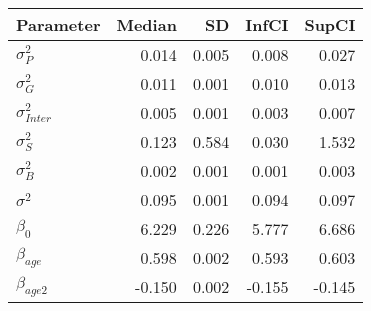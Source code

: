 \begin{table}[ht]
\centering
\begin{tabular}{lrrrr}
  \hline
Parameter & Median & SD & InfCI & SupCI \\ 
  \hline
$\sigma^{2}_{P}$ & 0.014 & 0.005 & 0.008 & 0.027 \\ 
  $\sigma^{2}_{G}$ & 0.011 & 0.001 & 0.010 & 0.013 \\ 
  $\sigma^{2}_{Inter}$ & 0.005 & 0.001 & 0.003 & 0.007 \\ 
  $\sigma^{2}_{S}$ & 0.123 & 0.584 & 0.030 & 1.532 \\ 
  $\sigma^{2}_{B}$ & 0.002 & 0.001 & 0.001 & 0.003 \\ 
  $\sigma^{2}$ & 0.095 & 0.001 & 0.094 & 0.097 \\ 
  $\beta_{0}$ & 6.229 & 0.226 & 5.777 & 6.686 \\ 
  $\beta_{age}$ & 0.598 & 0.002 & 0.593 & 0.603 \\ 
  $\beta_{age2}$ & -0.150 & 0.002 & -0.155 & -0.145 \\ 
   \hline
\end{tabular}
\end{table}
